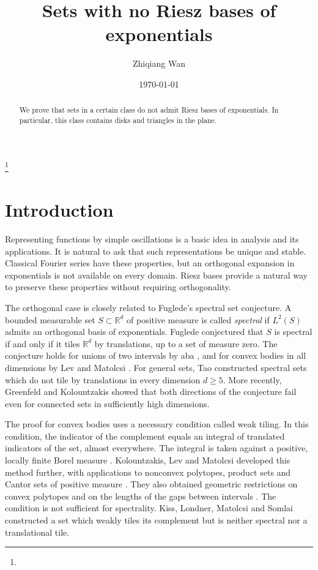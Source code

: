 \documentclass[12pt,reqno,tbtags]{amsart}
\def\R{\mathbb{R}}
\newcommand\1{\mathbbm{1}}
\begin{document}
\title[Sets with no Riesz bases of exponentials]{Sets with no Riesz bases of exponentials}

\author{Zhiqiang Wan}
\thanks{}
\address{School of Mathematical Sciences, University of Science and Technology of China, No. 96 Jinzhai Road, Baohe District, Hefei, Anhui Province, China}

\date{\today}

\begin{abstract}
We prove that sets in a certain class do not admit Riesz bases of exponentials.
In particular, this class contains disks and triangles in the plane.
\end{abstract}

\maketitle


\section{Introduction}
Representing functions by simple oscillations is a basic idea in analysis and its
applications. It is natural to ask that such representations be unique and stable.
Classical Fourier series have these properties, but an
orthogonal expansion in exponentials is not available on every domain. Riesz bases
provide a natural way to preserve these properties without requiring orthogonality.

The orthogonal case is closely related to Fuglede's spectral set conjecture.
A bounded measurable set $S\subset\R^d$ of positive measure is called
\emph{spectral} if $L^2(S)$ admits an orthogonal basis of exponentials.
Fuglede \cite{F74} conjectured that $S$ is spectral if and only if it tiles
$\R^d$ by translations, up to a set of measure zero.
The conjecture holds for unions of two intervals by
{\selectfont{}}aba \cite{La01}, and for convex bodies
in all dimensions by Lev and Matolcsi \cite{LM22}.
For general sets, Tao \cite{T04} constructed spectral sets which do not tile
by translations in every dimension $d\ge5$.
More recently, Greenfeld and Kolountzakis \cite{GK26} showed that both directions
of the conjecture fail even for connected sets in sufficiently high dimensions.

The proof for convex bodies uses a necessary condition called weak tiling.
In this condition, the indicator of the complement equals an integral of
translated indicators of the set, almost everywhere. The integral is taken
against a positive, locally finite Borel measure \cite{LM22}.
Kolountzakis, Lev and Matolcsi developed this method further, with applications
to nonconvex polytopes, product sets and Cantor sets of positive measure
\cite{KLM23}. They also obtained geometric restrictions on convex polytopes
and on the lengths of the gaps between intervals \cite{KLM25}.
The condition is not sufficient for spectrality. Kiss, Londner, Matolcsi and
Somlai \cite{KLMS26} constructed a set which weakly tiles its complement
but is neither spectral nor a translational tile.
\end{document}
